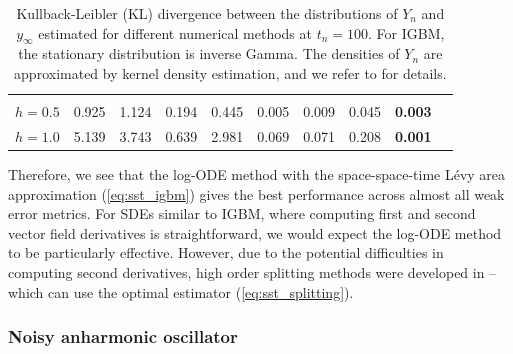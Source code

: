 \documentclass[sn-mathphys-num]{sn-jnl}%
\begin{document}
\begin{table}[ht]
\begin{tabular}{cccccccccc}
\midrule\\[-10pt]
$h = 0.5$  & 0.925 & 1.124  & 0.194 & 0.445 & 0.005 & 0.009 & 0.045 & \textbf{0.003}  \\[1pt]
$h = 1.0$  & 5.139 & 3.743 & 0.639 & 2.981 & 0.069 & 0.071 & 0.208 & \textbf{0.001}  \\
\bottomrule
\end{tabular}\medbreak
\caption{Kullback-Leibler (KL) divergence between the distributions of $Y_n$ and $y_\infty$ estimated for different numerical methods at $t_n = 100$. For IGBM, the stationary distribution is inverse Gamma. The densities of $Y_n$ are approximated by kernel density estimation, and we refer to \cite{tubikanec2022igbm} for details.}
\label{tab:igbm_mean_var3}
\end{table}\vspace*{-3.5mm}

Therefore, we see that the log-ODE method with the space-space-time L\'{e}vy area approximation (\ref{eq:sst_igbm}) gives the best performance across almost all weak error metrics.
For SDEs similar to IGBM, where computing first and second vector field derivatives is straightforward, we would expect the log-ODE method to be particularly effective.
However, due to the potential difficulties in computing second derivatives, high order splitting methods were developed in \cite{foster2024splitting} -- which can use the optimal estimator (\ref{eq:sst_splitting}).

\subsubsection{Noisy anharmonic oscillator}
\end{document}
